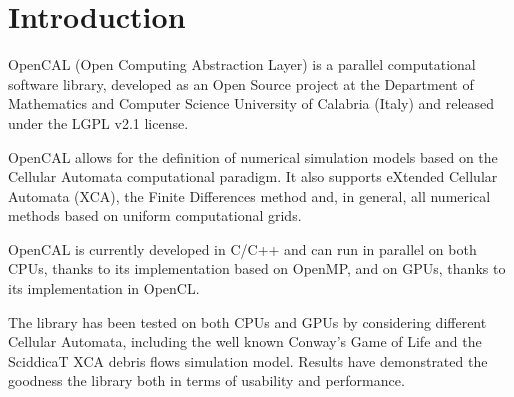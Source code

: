 \chapter{Introduction}

OpenCAL (Open Computing Abstraction Layer) is a parallel computational
software library, developed as an Open Source project at the
Department of Mathematics and Computer Science University of Calabria
(Italy) and released under the LGPL v2.1 license.

OpenCAL allows for the definition of numerical simulation models based
on the Cellular Automata computational paradigm. It also supports
eXtended Cellular Automata (XCA), the Finite Differences method and,
in general, all numerical methods based on uniform computational
grids.

OpenCAL is currently developed in C/C++ and can run in parallel on
both CPUs, thanks to its implementation based on OpenMP, and on GPUs,
thanks to its implementation in OpenCL.




The library has been tested on both CPUs and GPUs by considering
different Cellular Automata, including the well known Conway's Game of
Life and the SciddicaT XCA debris flows simulation model. Results have
demonstrated the goodness the library both in terms of usability and
performance.

